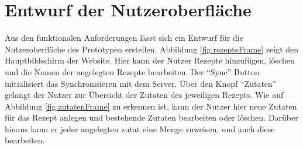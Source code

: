 \documentclass[a4paper, 12pt]{scrreprt}
\begin{document}
\section{Entwurf der Nutzeroberfläche}

Aus den funktionalen Anforderungen lässt sich ein Entwurf für die Nutzeroberfläche des Prototypen erstellen. Abbildung \ref{fig:rezepteFrame} zeigt den Hauptbildschirm der Website. Hier kann der Nutzer Rezepte hinzufügen, löschen und die Namen der angelegten Rezepte bearbeiten. Der \enquote{Sync} Button initialisiert das Synchronisieren mit dem Server. Über den Knopf \enquote{Zutaten} gelangt der Nutzer zur Übersicht der Zutaten des jeweiligen Rezepts. Wie auf Abbildung \ref{fig:zutatenFrame} zu erkennen ist, kann der Nutzer hier neue Zutaten für das Rezept anlegen und bestehende Zutaten bearbeiten oder löschen. Darüber hinaus kann er jeder angelegten zutat eine Menge zuweisen, und auch diese bearbeiten. 
\end{document}
